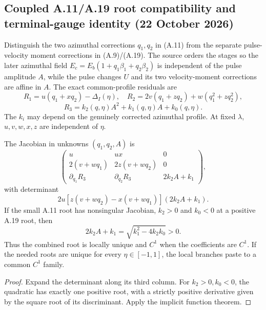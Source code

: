 \subsection*{Coupled A.11/A.19 root compatibility and terminal-gauge identity (22 October 2026)}
\label{subsec:a11-a19-coupled-gauge-20261022}
Distinguish the two azimuthal corrections $q_1,q_2$ in (A.11)
from the separate pulse-velocity moment corrections in (A.9)/(A.19).
The source orders the stages so the later azimuthal field
$E_c=E_b(1+q_1\beta_1+q_2\beta_2)$ is independent of the
pulse amplitude $A$, while the pulse changes $U$ and its two
velocity-moment corrections are affine in $A$.
The exact common-profile residuals are
\[
R_1=u(q_1+xq_2)-\Delta_I(\eta),\quad
R_2=2v(q_1+zq_2)+w(q_1^2+zq_2^2),
\]
\[
R_3=k_2(q,\eta)A^2+k_1(q,\eta)A+k_0(q,\eta).
\]
The $k_i$ may depend on the genuinely corrected azimuthal profile.
At fixed $\lambda$, $u,v,w,x,z$ are independent of $\eta$.

\begin{proposition}
The Jacobian in unknowns $(q_1,q_2,A)$ is
\[
\begin{pmatrix}
u&ux&0\\
2(v+wq_1)&2z(v+wq_2)&0\\
\partial_{q_1}R_3&\partial_{q_2}R_3&2k_2A+k_1
\end{pmatrix},
\]
with determinant
\begin{equation}\label{eq:joint-A11-A19-jac-20261022}
\boxed{2u[z(v+wq_2)-x(v+wq_1)](2k_2A+k_1).}
\end{equation}
If the small A.11 root has nonsingular Jacobian, $k_2>0$
and $k_0<0$ at a positive A.19 root, then
\[
2k_2A+k_1=\sqrt{k_1^2-4k_2k_0}>0.
\]
Thus the combined root is locally unique and $C^1$ when the
coefficients are $C^1$. If the needed roots are unique for every
$\eta\in[-1,1]$, the local branches paste to a common $C^1$ family.
\end{proposition}
\begin{proof}
Expand the determinant along its third column. For
$k_2>0,k_0<0$, the quadratic has exactly one positive
root, with a strictly positive derivative given by the square
root of its discriminant. Apply the implicit function theorem.
\end{proof}

